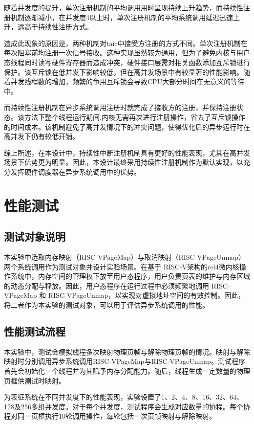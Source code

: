 随着并发度的提升，单次注册机制的平均调用用时呈现持续上升趋势，而持续性注册机制逐渐减小，在并发度4以上时，单次注册机制的平均系统调用延迟迅速上升，远高于持续性注册方式。

造成此现象的原因是，两种机制对taic中接受方注册的方式不同。单次注册机制在每次阻塞前均注册一次信号接收。这种实现虽然较为通用，但为了避免内核与用户态线程同时读写硬件寄存器而造成冲突，硬件接口层需对相关函数添加互斥锁进行保护。该互斥锁在低并发下影响较低，但在高并发场景中有较显著的性能影响。随着并发线程数的增加，频繁的争用互斥锁会导致CPU大部分时间在无意义的等待中。

而持续性注册机制在异步系统调用注册时就完成了接收方的注册，并保持注册状态。该方法下整个线程运行期间,内核无需再次进行注册操作，省去了互斥锁操作的时间成本。该机制避免了高并发情况下的冲突问题，使得优化后的异步运行时在高并发下仍有较低开销。

综上所述，在本设计中，持续性中断注册机制具有更好的性能表现，尤其在高并发场景下优势更为明显。因此，本设计最终采用持续性注册机制作为默认实现，以充分发挥硬件调度器在异步系统调用中的优势。

\section{性能测试}

\subsection{测试对象说明}

本实验中选取内存映射（RISC-VPageMap）与取消映射（RISC-VPageUnmap）两个系统调用作为测试对象并设计实验场景。在基于 RISC-V架构的rel4微内核操作系统中，内存空间的管理权下放至用户态程序，用户负责页表的维护与内存区域的动态分配与释放。因此，用户态程序在运行过程中必须频繁地调用 RISC-VPageMap 和 RISC-VPageUnmap，以实现对虚拟地址空间的有效控制。因此，将二者作为本实验的测试对象，可以用于评估异步系统调用的性能。

\subsection{性能测试流程}

本实验中，测试会模拟线程多次映射物理页帧与解除物理页帧的情况。映射与解除映射时分别调用异步系统调用RISC-VPageMap与RISC-VPageUnmap。测试程序首先会初始化一个线程并为其赋予内存分配能力。随后，线程生成一定数量的物理页框供测试时映射。

为表征系统在不同并发度下的性能表现，实验设置了1、2、4、8、16、32、64、128及256多组并发度。对于每个并发度，测试程序会生成对应数量的协程。每个协程对同一页框执行10轮调用操作，每轮包括一次页帧映射与解除映射。

